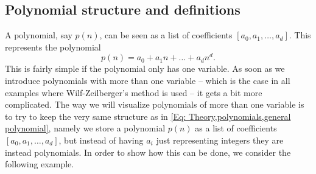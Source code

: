 \subsection{Polynomial structure and definitions}\label{Sub: polystruct}

A polynomial, say $p(n)$, can be seen as a list of coefficients $[a_0,a_1,\ldots,a_d]$. This represents the polynomial
\begin{equation}\label{Eq: Theory,polynomials,general polynomial}
  p(n) = a_0+a_1 n + \ldots + a_d n^d.
\end{equation}
This is fairly simple if the polynomial only has one variable. As soon as we introduce polynomials with more than one variable -- which is the case in all examples where Wilf-Zeilberger's method is used -- it gets a bit more complicated. The way we will visualize polynomials of more than one variable is to try to keep the very same structure as in \eqref{Eq: Theory,polynomials,general polynomial}, namely we store a polynomial $p(n)$ as a list of coefficients $[a_0,a_1,\ldots,a_d]$, but instead of having $a_i$ just representing integers they are instead polynomials. In order to show how this can be done, we consider the following example.
